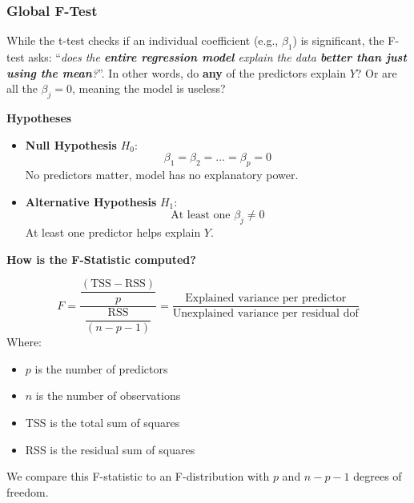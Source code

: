 \subsubsection{Global F-Test}\label{subsubsection: Global F-Test}

While the t-test checks if an individual coefficient (e.g., $\beta_1$) is significant, the F-test asks: ``\emph{does the \textbf{entire regression model} explain the data \textbf{better than just using the mean}?}''. In other words, do \textbf{any} of the predictors explain $Y$? Or are all the $\beta_j = 0$, meaning the model is useless?

\highspace
\begin{flushleft}
    \textcolor{Green3}{ \textbf{Hypotheses}}
\end{flushleft}
\begin{itemize}
    \item \textbf{Null Hypothesis} $H_0$:
    \begin{equation*}
        \beta_1 = \beta_2 = \dots = \beta_p = 0
    \end{equation*}
    No predictors matter, model has no explanatory power.

    \item \textbf{Alternative Hypothesis} $H_1$:
    \begin{equation*}
        \text{At least one } \beta_j \ne 0
    \end{equation*}
    At least one predictor helps explain $Y$.
\end{itemize}

\highspace
\begin{flushleft}
    \textcolor{Green3}{ \textbf{How is the F-Statistic computed?}}
\end{flushleft}
\begin{equation}
    F = \dfrac{
        \dfrac{\left(\text{TSS} - \text{RSS}\right)}{p}
    }{
        \dfrac{\text{RSS}}{\left(n - p - 1\right)}
    } = \dfrac{
        \text{Explained variance per predictor}
    }{
        \text{Unexplained variance per residual dof}
    }
\end{equation}
Where:
\begin{itemize}
    \item $p$ is the number of predictors
    \item $n$ is the number of observations
    \item TSS is the total sum of squares
    \item RSS is the residual sum of squares
\end{itemize}
We compare this F-statistic to an F-distribution with $p$ and $n-p-1$ degrees of freedom.

